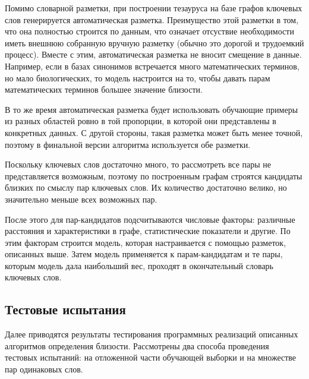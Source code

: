 Помимо словарной разметки, при построении тезауруса на базе графов ключевых слов генерируется автоматическая разметка. Преимущество этой разметки в том, что она полностью строится по данным, что означает отсуствие необходимости иметь внешнюю собранную вручную разметку (обычно это дорогой и трудоемкий процесс). Вместе с этим, автоматическая разметка не вносит смещение в данные. Например, если в базах синонимов встречается много математических терминов, но мало биологических, то модель настроится на то, чтобы давать парам математических терминов большее значение близости. 

В то же время автоматическая разметка будет использовать обучающие примеры из разных областей ровно в той пропорции, в которой они представлены в конкретных данных. С другой стороны, такая разметка может быть менее точной, поэтому в финальной версии алгоритма используется обе разметки.

Поскольку ключевых слов достаточно много, то рассмотреть все пары не представляется возможным, поэтому по построенным графам строятся кандидаты близких по смыслу пар ключевых слов. Их количество достаточно велико, но значительно меньше всех возможных пар.

После этого для пар-кандидатов подсчитываются числовые факторы: различные расстояния и характеристики в графе, статистические показатели и другие. По этим факторам строится модель, которая настраивается с помощью разметок, описанных выше. Затем модель применяется к парам-кандидатам и те пары, которым модель дала наибольший вес, проходят в окончательный словарь ключевых слов.

\subsection{Тестовые испытания}
Далее приводятся результаты тестирования программных реализаций описанных алгоритмов определения близости. Рассмотрены два способа проведения тестовых испытаний: на отложенной части обучающей выборки и на множестве пар одинаковых слов.


